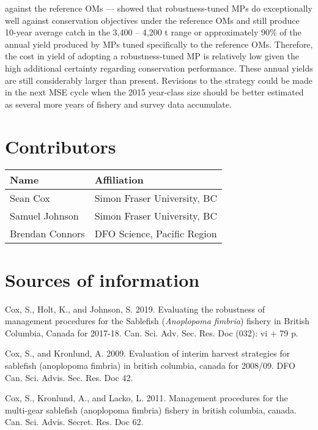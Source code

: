 \documentclass[11pt]{book}
\begin{document}
against the reference OMs --- showed that robustness-tuned MPs do exceptionally well against conservation objectives under the reference OMs and still produce 10-year average catch in the 3,400 -- 4,200 t range or approximately 90\% of the annual yield produced by MPs tuned specifically to the reference OMs. Therefore, the cost in yield of adopting a robustness-tuned MP is relatively low given the high additional certainty regarding conservation performance. These annual yields are still considerably larger than present. Revisions to the strategy could be made in the next MSE cycle when the 2015 year-class size should be better estimated as several more years of fishery and survey data accumulate.

\hypertarget{contributors}{%
\section{Contributors}\label{contributors}}
\begin{longtable}[]{@{}ll@{}}
\toprule
Name & Affiliation\tabularnewline
\midrule
\endhead
Sean Cox & Simon Fraser University, BC\tabularnewline
Samuel Johnson & Simon Fraser University, BC\tabularnewline
Brendan Connors & DFO Science, Pacific Region\tabularnewline
\bottomrule
\end{longtable}
\MakeApproval

\hypertarget{sources-of-information}{%
\section{Sources of information}\label{sources-of-information}}

\hypertarget{refs}{}
\leavevmode\hypertarget{ref-cox2019evaluating}{}%
Cox, S., Holt, K., and Johnson, S. 2019. Evaluating the robustness of management procedures for the Sablefish (\emph{Anoplopoma fimbria}) fishery in British Columbia, Canada for 2017-18. Can. Sci. Adv. Sec. Res. Doc (032): vi + 79 p.

\leavevmode\hypertarget{ref-cox2009evaluation}{}%
Cox, S., and Kronlund, A. 2009. Evaluation of interim harvest strategies for sablefish (anoplopoma fimbria) in british columbia, canada for 2008/09. DFO Can. Sci. Advis. Sec. Res. Doc 42.

\leavevmode\hypertarget{ref-cox2011management}{}%
Cox, S., Kronlund, A., and Lacko, L. 2011. Management procedures for the multi-gear sablefish (anoplopoma fimbria) fishery in british columbia, canada. Can. Sci. Advis. Secret. Res. Doc 62.
\end{document}
